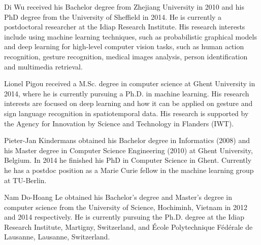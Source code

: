 


\begin{IEEEbiography}{Di Wu}
received his Bachelor degree from Zhejiang University in 2010 and his PhD degree from the University of Sheffield in 2014. He is currently a postdoctoral researcher at the Idiap Research Institute. His research interests include using machine learning techniques, such as probabilistic graphical models and deep learning for high-level computer vision tasks, such as human action recognition, gesture recognition, medical images analysis, person identification and multimedia retrieval.
\end{IEEEbiography}

\begin{IEEEbiography}{Lionel Pigou}
received a M.Sc. degree in computer science at Ghent University in 2014, where he is currently pursuing a Ph.D. in machine learning. His research interests are focused on deep learning and how it can be applied on gesture and sign language recognition in spatiotemporal data. His research is supported by the Agency for Innovation by Science and Technology in Flanders (IWT).
\end{IEEEbiography}


\begin{IEEEbiography}{Pieter-Jan Kindermans}
obtained his Bachelor degree in Informatics (2008) and his Master degree in Computer Science Engineering (2010) at Ghent University, Belgium. In 2014 he finished his PhD in Computer Science in Ghent. Currently he has a postdoc position as a Marie Curie fellow in the machine learning group at TU-Berlin.
\end{IEEEbiography}


\begin{IEEEbiography}{Nam Do-Hoang Le}
 obtained his Bachelor's degree and Master's degree in computer science from the University of Science, Hochiminh, Vietnam in 2012 and 2014 respectively.
He is currently pursuing the Ph.D. degree at the Idiap Research Institute, Martigny, Switzerland, and \'Ecole Polytechnique F\'ed\'erale de Lausanne, Lausanne, Switzerland.
\end{IEEEbiography}


